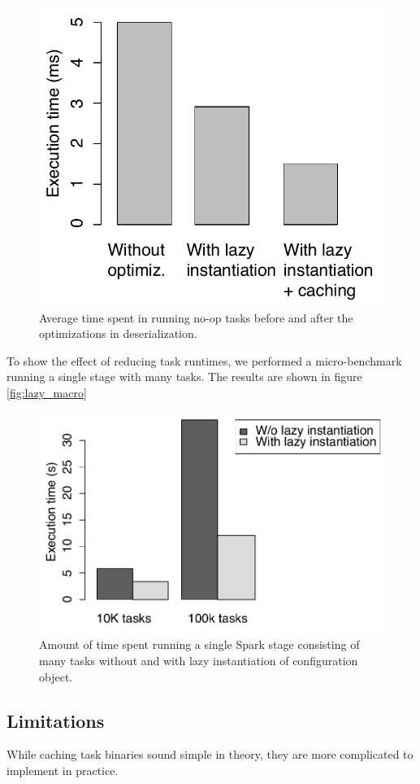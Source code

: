 \begin{figure}[t!]
 \begin{center}
   \includegraphics[scale=0.60]{images_graphs/optimizations/graph3/runtime_optimizations.pdf}
 \end{center}
 \caption{Average time spent in running no-op tasks before and after the optimizations in deserialization.}
 \label{fig:runtime_optimizations}
\end{figure}

To show the effect of reducing task runtimes, we performed a micro-benchmark running a single stage with many tasks. The results are shown in figure \ref{fig:lazy_macro}

\begin{figure}[t!]
 \begin{center}
   \includegraphics[scale=0.50]{images_graphs/optimizations/graph1/lazy_micro.pdf}
 \end{center}
 \caption{Amount of time spent running a single Spark stage consisting of many tasks without and with lazy instantiation of configuration object.}
 \label{fig:lazy_micro}
\end{figure}

\subsection{Limitations}
While caching task binaries sound simple in theory, they are more complicated to implement in practice. 
